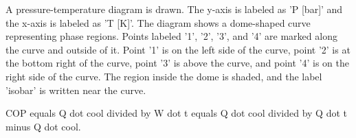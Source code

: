 A pressure-temperature diagram is drawn. The y-axis is labeled as 'P [bar]' and the x-axis is labeled as 'T [K]'. The diagram shows a dome-shaped curve representing phase regions. Points labeled '1', '2', '3', and '4' are marked along the curve and outside of it. Point '1' is on the left side of the curve, point '2' is at the bottom right of the curve, point '3' is above the curve, and point '4' is on the right side of the curve. The region inside the dome is shaded, and the label 'isobar' is written near the curve.

COP equals Q dot cool divided by W dot t equals Q dot cool divided by Q dot t minus Q dot cool.